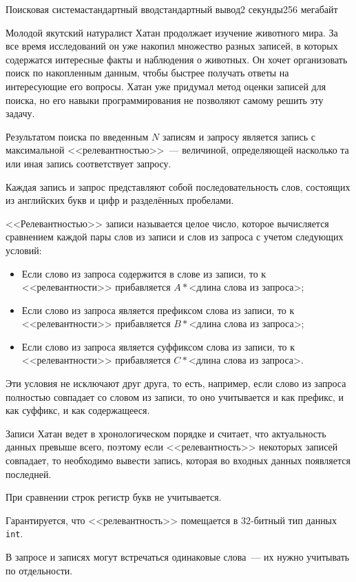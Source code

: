 \begin{problem}{Поисковая система}{стандартный ввод}{стандартный вывод}{2 секунды}{256 мегабайт}

Молодой якутский натуралист Хатан продолжает изучение животного мира. За все время исследований он уже накопил множество разных записей, в которых содержатся интересные факты и наблюдения о животных. Он хочет организовать поиск по накопленным данным, чтобы быстрее получать ответы на интересующие его вопросы. Хатан уже придумал метод оценки записей для поиска, но его навыки программирования не позволяют самому решить эту задачу. 

Результатом поиска по введенным $N$ записям и запросу является запись с максимальной <<релевантностью>>~--- величиной, определяющей насколько та или иная запись соответствует запросу.

Каждая запись и запрос представляют собой последовательность слов, состоящих из английских букв и цифр и разделённых пробелами.

<<Релевантностью>> записи называется целое число, которое вычисляется сравнением каждой пары слов из записи и слов из запроса с учетом следующих условий:
\begin{itemize}
 \item Если слово из запроса содержится в слове из записи, то к <<релевантности>> прибавляется $A*\text{<длина слова из запроса>}$;
 \item Если слово из запроса является префиксом слова из записи, то к <<релевантности>> прибавляется $B*\text{<длина слова из запроса>}$;
 \item Если слово из запроса является суффиксом слова из записи, то к <<релевантности>> прибавляется $C*\text{<длина слова из запроса>}$.
\end{itemize}

Эти условия не исключают друг друга, то есть, например, если слово из запроса полностью совпадает со словом из записи, то оно учитывается и как префикс, и как суффикс, и как содержащееся.

Записи Хатан ведет в хронологическом порядке и считает, что актуальность данных превыше всего, поэтому если <<релевантность>> некоторых записей совпадает, то необходимо вывести запись, которая во входных данных появляется последней.

При сравнении строк регистр букв не учитывается.

Гарантируется, что <<релевантность>> помещается в 32-битный тип данных \texttt{int}.

В запросе и записях могут встречаться одинаковые слова~--- их нужно учитывать по отдельности.


\end{problem}
